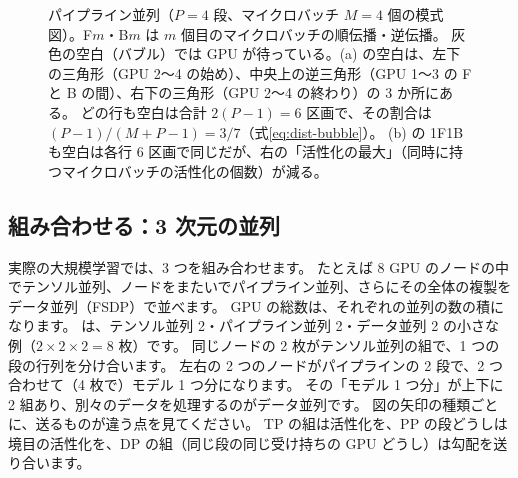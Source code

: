 \begin{figure}[tbp]
\caption{パイプライン並列（$P=4$ 段、マイクロバッチ $M=4$ 個の模式図）。F$m$・B$m$ は $m$ 個目のマイクロバッチの順伝播・逆伝播。
灰色の空白（バブル）では GPU が待っている。(a) の空白は、左下の三角形（GPU 2〜4 の始め）、中央上の逆三角形（GPU 1〜3 の F と B の間）、右下の三角形（GPU 2〜4 の終わり）の 3 か所にある。
どの行も空白は合計 $2(P-1)=6$ 区画で、その割合は $(P-1)/(M+P-1)=3/7$（式\eqref{eq:dist-bubble}）。
(b) の 1F1B も空白は各行 6 区画で同じだが、右の「活性化の最大」（同時に持つマイクロバッチの活性化の個数）が減る。}
\label{fig:dist-pp}
\end{figure}

\subsection*{組み合わせる：3 次元の並列}

実際の大規模学習では、3 つを組み合わせます。
たとえば 8 GPU のノードの中でテンソル並列、ノードをまたいでパイプライン並列、さらにその全体の複製をデータ並列（FSDP）で並べます。
GPU の総数は、それぞれの並列の数の積になります。
は、テンソル並列 2・パイプライン並列 2・データ並列 2 の小さな例（$2\times2\times2=8$ 枚）です。
同じノードの 2 枚がテンソル並列の組で、1 つの段の行列を分け合います。
左右の 2 つのノードがパイプラインの 2 段で、2 つ合わせて（4 枚で）モデル 1 つ分になります。
その「モデル 1 つ分」が上下に 2 組あり、別々のデータを処理するのがデータ並列です。
図の矢印の種類ごとに、送るものが違う点を見てください。
TP の組は活性化を、PP の段どうしは境目の活性化を、DP の組（同じ段の同じ受け持ちの GPU どうし）は勾配を送り合います。


